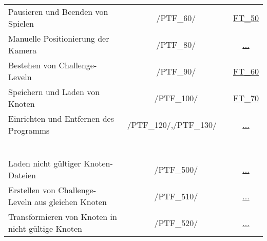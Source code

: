 \begin{longtable}{p{0.5\hsize}p{0.275\hsize}p{0.275\hsize}}
	\\
	
	  \multicolumn{1}{L{6.5cm}}{Pausieren und Beenden von Spielen}
	& \multicolumn{1}{c}{/PTF\_60/}
	& \multicolumn{1}{c}{\hyperref[FT::50]{FT\_50}}
	
	\\
	
	  \multicolumn{1}{L{6.5cm}}{Manuelle Positionierung der Kamera}
	& \multicolumn{1}{c}{/PTF\_80/}
	& \multicolumn{1}{c}{\hyperref[]{...}}
	
	\\
	
	  \multicolumn{1}{L{6.5cm}}{Bestehen von Challenge-Leveln}
	& \multicolumn{1}{c}{/PTF\_90/}
	& \multicolumn{1}{c}{\hyperref[FT::60]{FT\_60}}
	
	\\
	
	  \multicolumn{1}{L{6.5cm}}{Speichern und Laden von Knoten}
	& \multicolumn{1}{c}{/PTF\_100/}
	& \multicolumn{1}{c}{\hyperref[FT::70]{FT\_70}}
	
	\\
	
	  \multicolumn{1}{L{6.5cm}}{Einrichten und Entfernen des Programms}
	& \multicolumn{1}{C{3cm}}{/PTF\_120/,\newline/PTF\_130/~~}
	& \multicolumn{1}{c}{\hyperref[]{...}}
	
	\\
	


\newpage




	  \multicolumn{3}{l}{\textbf{Negativtests:}}
	  
	\\
	
	  \multicolumn{3}{l}{~}
	  
	\\
	
	  \multicolumn{1}{L{6.5cm}}{Laden nicht gültiger Knoten-Dateien}
	& \multicolumn{1}{c}{/PTF\_500/}
	& \multicolumn{1}{c}{\hyperref[]{...}}
	
	\\
	
	  \multicolumn{1}{L{6.5cm}}{Erstellen von Challenge-Leveln aus gleichen Knoten}
	& \multicolumn{1}{c}{/PTF\_510/}
	& \multicolumn{1}{c}{\hyperref[]{...}}
	
	\\
	
	  \multicolumn{1}{L{6.5cm}}{Transformieren von Knoten in nicht gültige Knoten}
	& \multicolumn{1}{c}{/PTF\_520/}
	& \multicolumn{1}{c}{\hyperref[]{...}}
	

\end{longtable}
